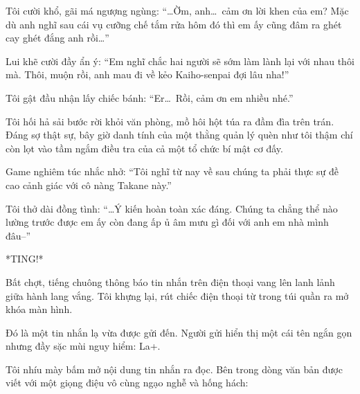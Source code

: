 \documentclass[../main.tex]{subfiles}
\begin{document}
Tôi cười khổ, gãi má ngượng ngùng: ``\dots Ờm, anh\dots\ cảm ơn lời khen của em? Mặc dù anh nghĩ sau cái vụ cưỡng chế tắm rửa hôm đó thì em ấy cũng đâm ra ghét cay ghét đắng anh rồi\dots''

Lui khẽ cười đầy ẩn ý: ``Em nghĩ chắc hai người sẽ sớm làm lành lại với nhau thôi mà. Thôi, muộn rồi, anh mau đi về kẻo Kaiho-senpai đợi lâu nha!''

Tôi gật đầu nhận lấy chiếc bánh: ``Er\dots\ Rồi, cảm ơn em nhiều nhé.''

Tôi hối hả sải bước rời khỏi văn phòng, mồ hôi hột túa ra đầm đìa trên trán. Đáng sợ thật sự, bây giờ danh tính của một thằng quản lý quèn như tôi thậm chí còn lọt vào tầm ngắm điều tra của cả một tổ chức bí mật cơ đấy.

Game nghiêm túc nhắc nhở: ``Tôi nghĩ từ nay về sau chúng ta phải thực sự đề cao cảnh giác với cô nàng Takane này.''

Tôi thở dài đồng tình: ``\dots Ý kiến hoàn toàn xác đáng. Chúng ta chẳng thể nào lường trước được em ấy còn đang ấp ủ âm mưu gì đối với anh em nhà mình đâu--''

*TING!*

Bất chợt, tiếng chuông thông báo tin nhắn trên điện thoại vang lên lanh lảnh giữa hành lang vắng. Tôi khựng lại, rút chiếc điện thoại từ trong túi quần ra mở khóa màn hình.

Đó là một tin nhắn lạ vừa được gửi đến. Người gửi hiển thị một cái tên ngắn gọn nhưng đầy sặc mùi nguy hiểm: La+.

Tôi nhíu mày bấm mở nội dung tin nhắn ra đọc. Bên trong dòng văn bản được viết với một giọng điệu vô cùng ngạo nghễ và hống hách:

\end{document}
